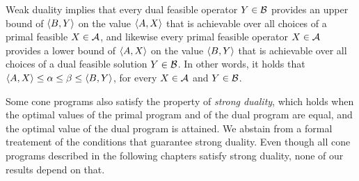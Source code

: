 Weak duality implies that every dual feasible operator $Y \in \mathcal{B}$ provides an
upper bound of $\langle B , Y\rangle$ on the value $\langle A , X\rangle$ that is achievable over all
choices of a primal feasible $X \in \mathcal{A}$, and likewise every primal feasible 
operator $X \in \mathcal{A}$ provides a lower bound of $\langle A , X\rangle$ on the value 
$\langle B , Y\rangle$
that is achievable over all choices of a dual feasible solution $Y \in \mathcal{B}$. 
In other words, it holds that
$\langle A , X\rangle \leq \alpha \leq \beta \leq \langle B , Y\rangle$,
for every $X \in \mathcal{A}$ and $Y \in \mathcal{B}$. 

Some cone programs also satisfy 
the property of \emph{strong duality}, which holds when
the optimal values of the primal program and of the dual program are equal, and 
the optimal value of the dual program is attained.
We abstain from a formal treatement of the conditions that guarantee
strong duality. Even though all cone programs described in the following chapters 
satisfy strong duality, none of our results depend on that.
